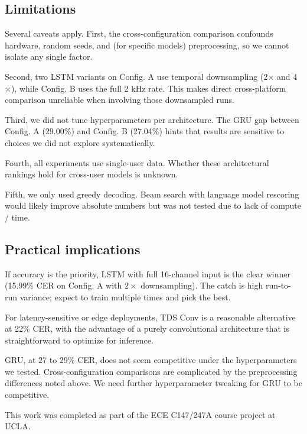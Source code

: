 \documentclass{article}
\begin{document}
\subsection{Limitations}

Several caveats apply. First, the cross-configuration comparison confounds hardware, random seeds, and (for specific models) preprocessing, so we cannot isolate any single factor.

Second, two LSTM variants on Config. A use temporal downsampling (2$\times$ and 4$\times$), while Config. B uses the full 2 kHz rate. This makes direct cross-platform comparison unreliable when involving those downsampled runs.

Third, we did not tune hyperparameters per architecture. The GRU gap between Config. A (29.00\%) and Config. B (27.04\%) hints that results are sensitive to choices we did not explore systematically.

Fourth, all experiments use single-user data. Whether these architectural rankings hold for cross-user models is unknown.

Fifth, we only used greedy decoding. Beam search with language model rescoring would likely improve absolute numbers but was not tested due to lack of compute / time.

\subsection{Practical implications}

If accuracy is the priority, LSTM with full 16-channel input is the clear winner (15.99\% CER on Config. A with $2\times$ downsampling). The catch is high run-to-run variance; expect to train multiple times and pick the best.

For latency-sensitive or edge deployments, TDS Conv is a reasonable alternative at 22\% CER, with the advantage of a purely convolutional architecture that is straightforward to optimize for inference.

GRU, at 27 to 29\% CER, does not seem competitive under the hyperparameters we tested. Cross-configuration comparisons are complicated by the preprocessing differences noted above. We need further hyperparameter tweaking for GRU to be competitive.

\begin{ack}
This work was completed as part of the ECE C147/247A course project at UCLA.
\end{ack}
\end{document}

